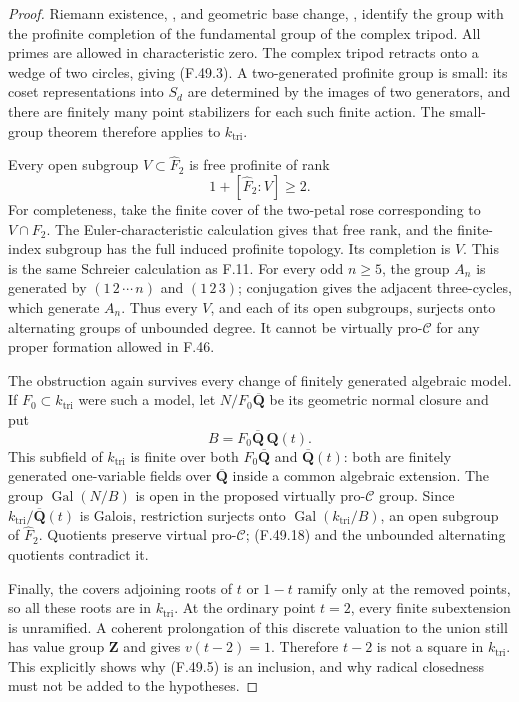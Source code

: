\begin{proof}
Riemann existence, \citet[Exposé~XII, Theorem~5.1, p.~333]{F_SGA1},
and geometric base change,
\citet[Exposé~XIII, 4.5.3, p.~421]{F_SGA1}, identify the group
with the profinite completion of the fundamental group of the
complex tripod. All primes are allowed in characteristic zero.
The complex tripod retracts onto a wedge of two circles, giving
(F.49.3). A two-generated profinite group is small: its coset
representations into \(S_d\) are determined by the images of two
generators, and there are finitely many point stabilizers for
each such finite action. The small-group theorem therefore
applies to \(k_{\mathrm{tri}}\).

Every open subgroup \(V\subset\widehat F_2\) is free profinite of rank
\[
                         1+[\widehat F_2:V]\ge2.
 \tag{F.49.18}
\]
For completeness, take the finite cover of the two-petal rose
corresponding to \(V\cap F_2\). The Euler-characteristic calculation
gives that free rank, and the finite-index subgroup has the full
induced profinite topology. Its completion is \(V\).
This is the same Schreier calculation as F.11.
For every odd \(n\ge5\), the group \(A_n\) is generated by
\((1\,2\,\cdots\,n)\) and \((1\,2\,3)\); conjugation gives
the adjacent three-cycles, which generate \(A_n\).
Thus every \(V\), and each of its open subgroups, surjects onto
alternating groups of unbounded degree. It cannot be virtually
pro-\(\mathcal C\) for any proper formation allowed in F.46.

The obstruction again survives every change of finitely generated
algebraic model. If \(F_0\subset k_{\mathrm{tri}}\) were such
a model, let \(N/F_0\overline{\mathbf Q}\) be its geometric
normal closure and put
\[
                         B=F_0\overline{\mathbf Q}\,\mathbf Q(t).
\]
This subfield of \(k_{\mathrm{tri}}\) is finite over both
\(F_0\overline{\mathbf Q}\) and \(\overline{\mathbf Q}(t)\):
both are finitely generated one-variable fields over
\(\overline{\mathbf Q}\) inside a common algebraic extension.
The group \(\operatorname{Gal}(N/B)\) is open in the proposed
virtually pro-\(\mathcal C\) group. Since
\(k_{\mathrm{tri}}/\overline{\mathbf Q}(t)\) is Galois,
restriction surjects onto
\(\operatorname{Gal}(k_{\mathrm{tri}}/B)\), an open subgroup
of \(\widehat F_2\). Quotients preserve virtual pro-\(\mathcal C\);
(F.49.18) and the unbounded alternating quotients contradict it.

Finally, the covers adjoining roots of \(t\) or \(1-t\) ramify
only at the removed points, so all these roots are in
\(k_{\mathrm{tri}}\). At the ordinary point \(t=2\), every
finite subextension is unramified. A coherent prolongation of
this discrete valuation to the union still has value group
\(\mathbf Z\) and gives \(v(t-2)=1\). Therefore \(t-2\) is not
a square in \(k_{\mathrm{tri}}\).
This explicitly shows why (F.49.5) is an inclusion, and why
radical closedness must not be added to the hypotheses.


\end{proof}
